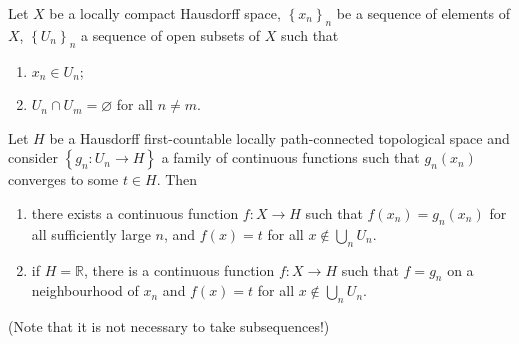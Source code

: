 \begin{proposition}\label{propositionconstructfunction}
Let $X$ be a locally compact Hausdorff space, $\left\{x_n\right\}_n$ be a sequence of elements of $X$, $\left\{U_n\right\}_n$ a sequence of open subsets of $X$ such that
\begin{enumerate}
\item[(i)] $x_n\in U_n$;
\item[(ii)] $U_n\cap U_m=\varnothing$ for all $n\neq m$.
\end{enumerate}
Let $H$ be a Hausdorff first-countable locally path-connected topological space and consider $\left\{g_n:U_n\to H\right\}$ a family of continuous functions such that $g_n(x_n)$ converges to some $t\in H$. Then
\begin{enumerate}
\item[(a)] there exists a continuous function $f:X\to H$ such that $f(x_n)=g_n(x_n)$ for all sufficiently large $n$, and $f(x)=t$ for all $x\not\in\bigcup_n U_n$.
\item[(b)] if $H=\mathbb{R}$, there is a continuous function $f:X\to H$ such that $f=g_n$ on a neighbourhood of $x_n$ and $f(x)=t$ for all $x\not\in\bigcup_n U_n$.
\end{enumerate}
(Note that it is not necessary to take subsequences!)
\end{proposition}
